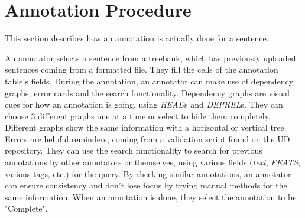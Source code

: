 \section{Annotation Procedure}
\label{sec:annotation}
This section describes how an annotation is actually done for a sentence.

An annotator selects a sentence from a treebank, which has previously uploaded sentences coming from a \conllu{} formatted file.
They fill the cells of the annotation table's fields.
During the annotation, an annotator can make use of dependency graphs, error cards and the search functionality.
Dependency graphs are visual cues for how an annotation is going, using \textit{HEAD}s and \textit{DEPREL}s.
They can choose 3 different graphs one at a time or select to hide them completely.
Different graphs show the same information with a horizontal or vertical tree.
Errors are helpful reminders, coming from a validation script found on the UD repository.
They can use the search functionality to search for previous annotations by other annotators or themselves, using various fields (\textit{text}, \textit{FEATS}, various tags, etc.) for the query.
By checking similar annotations, an annotator can ensure consistency and don't lose focus by trying manual methods for the same information.
When an annotation is done, they select the annotation to be "Complete".
